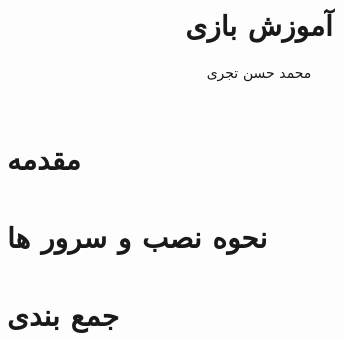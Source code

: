 \documentclass{report}
\title{{\Huge آموزش بازی \lr{dungeon crawl stone soup}}}
\author{{\LARGE محمد حسن تجری}}
\date{{\LARGE}}
\begin{document}
\maketitle

\begin{persian}

  \tableofcontents

  \chapter*{مقدمه}

  \chapter*{نحوه نصب و سرور ها}

  

  

  \chapter*{جمع بندی}

\end{persian}
\end{document}
